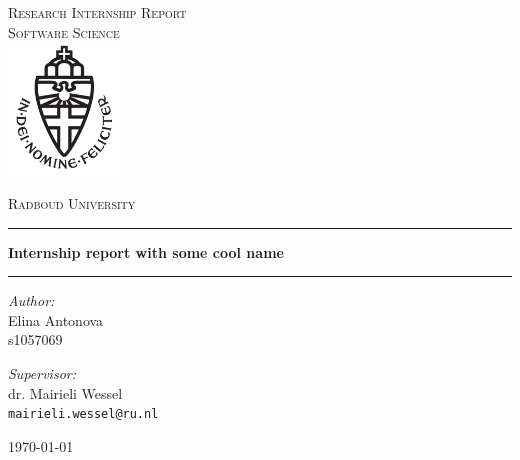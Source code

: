 \documentclass[11pt,a4paper]{report}
\begin{document}
\begin{titlepage}
\begin{center}
\textsc{\LARGE Research Internship Report\\Software Science}\\[1.5cm]
\includegraphics[height=100pt]{logo}

\vspace{0.4cm}
\textsc{\Large Radboud University}\\[1cm]
\hrule
\vspace{0.4cm}
\textbf{\huge Internship report with some cool name}\\[0.4cm]
\hrule
\vspace{2cm}
\begin{minipage}[t]{0.45\textwidth}
\begin{flushleft} \large
\textit{Author:}\\
Elina Antonova\\
s1057069
\end{flushleft}
\end{minipage}
\begin{minipage}[t]{0.45\textwidth}
\begin{flushright} \large
\textit{Supervisor:}\\
dr. Mairieli Wessel \\
\texttt{mairieli.wessel@ru.nl}\\[1.3cm]
\end{flushright}
\end{minipage}
\vfill
{\large \today}
\end{center}
\end{titlepage}



\tableofcontents










\printglossary



\appendix

\end{document}
